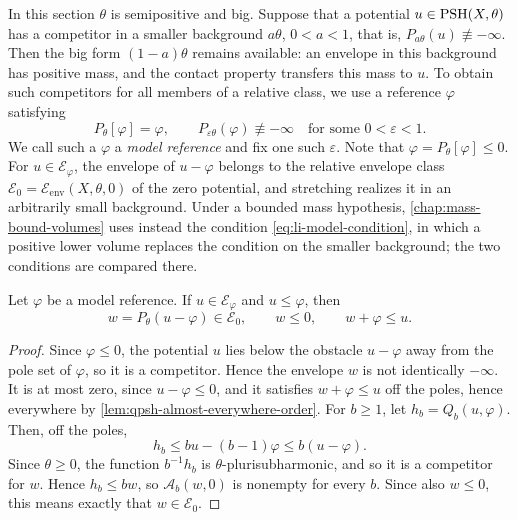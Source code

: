 In this section $\theta$ is semipositive and big. Suppose that a potential $u\in\mathrm{PSH}(X,\theta)$ has a competitor in a smaller background $a\theta$, $0<a<1$, that is, $P_{a\theta}(u)\not\equiv-\infty$. Then the big form $(1-a)\theta$ remains available: an envelope in this background has positive mass, and the contact property transfers this mass to $u$. To obtain such competitors for all members of a relative class, we use a reference $\varphi$ satisfying
\begin{equation}\label{eq:als-model-condition}
 P_\theta[\varphi]=\varphi,\qquad
 P_{\varepsilon\theta}(\varphi)\not\equiv-\infty
 \quad\text{for some }0<\varepsilon<1.
\end{equation}
We call such a $\varphi$ a \emph{model reference} and fix one such $\varepsilon$. Note that $\varphi=P_\theta[\varphi]\leq0$. For $u\in\mathcal E_\varphi$, the envelope of $u-\varphi$ belongs to the relative envelope class $\mathcal E_0=\mathcal E_{\mathrm{env}}(X,\theta,0)$ of the zero potential, and stretching realizes it in an arbitrarily small background. Under a bounded mass hypothesis, \cref{chap:mass-bound-volumes} uses instead the condition \eqref{eq:li-model-condition}, in which a positive lower volume replaces the condition on the smaller background; the two conditions are compared there.

\begin{lemma}\label{lem:relative-difference-envelope}
Let $\varphi$ be a model reference. If $u\in\mathcal E_\varphi$ and $u\leq\varphi$, then
\[
 w=P_\theta(u-\varphi)\in\mathcal E_0,
 \qquad w\leq0,
 \qquad w+\varphi\leq u.
\]
\end{lemma}
\begin{proof}
Since $\varphi\leq0$, the potential $u$ lies below the obstacle $u-\varphi$ away from the pole set of $\varphi$, so it is a competitor. Hence the envelope $w$ is not identically $-\infty$. It is at most zero, since $u-\varphi\leq0$, and it satisfies $w+\varphi\leq u$ off the poles, hence everywhere by \cref{lem:qpsh-almost-everywhere-order}. For $b\geq1$, let $h_b=Q_b(u,\varphi)$. Then, off the poles,
\[
 h_b\leq bu-(b-1)\varphi\leq b(u-\varphi).
\]
Since $\theta\geq0$, the function $b^{-1}h_b$ is $\theta$-plurisubharmonic, and so it is a competitor for $w$. Hence $h_b\leq bw$, so $\mathcal A_b(w,0)$ is nonempty for every $b$. Since also $w\leq0$, this means exactly that $w\in\mathcal E_0$.
\end{proof}


